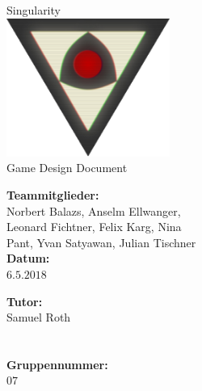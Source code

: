 \documentclass[12pt]{article}
\newcommand{\changefont}[4]{{\fontfamily{#1}\fontsize{#2}{#3}\selectfont #4}} %
\begin{document}
\renewcommand{\figurename}{Fig.}%
\renewcommand{\arraystretch}{1.4}%

\begin{titlepage}
	\begin{center}	
		\changefont{pbk}{32}{35}{Singularity}\\\vspace{3em}
		\includegraphics[width=0.4\textwidth]{res/SingularityLogo2.png}\\\vspace{5em}
		\changefont{cmr}{32}{35}{Game Design Document}
	\end{center}
	\vspace{7em}

	\begin{minipage}[t]{.5\textwidth}
		\begin{center}
			\textbf{Teammitglieder:}\\
			\vspace{.5em}
			Norbert Balazs, Anselm Ellwanger,\\
			Leonard Fichtner, Felix Karg, Nina\\
			Pant, Yvan Satyawan, Julian Tischner\\
			\vspace{2em}
			\textbf{Datum:}\\
			\vspace{.5em}
			$6.5.2018$
		\end{center}
	\end{minipage}
	\begin{minipage}[t]{.5\textwidth}
		\begin{center}
			\textbf{Tutor:}\\
			\vspace{.5em}
			Samuel Roth\\
			\quad\\
			\quad\\
			\vspace{2em}
			\textbf{Gruppennummer:}\\
			\vspace{.5em}
			$07$
		\end{center}
	\end{minipage}
\end{titlepage}
\end{document}

